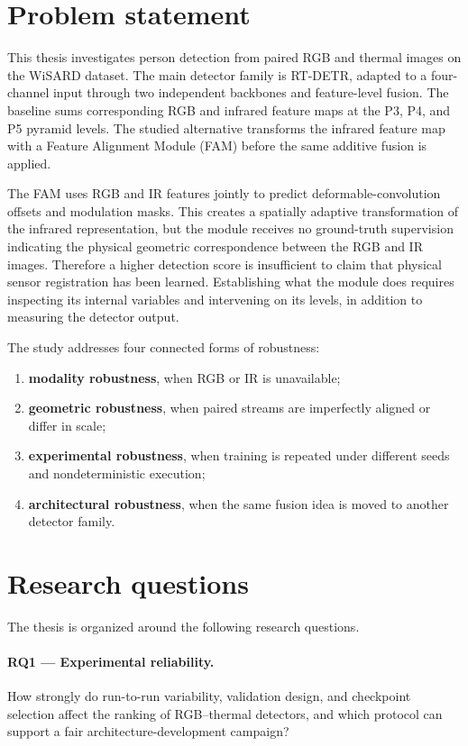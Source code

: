 \section{Problem statement}

This thesis investigates person detection from paired RGB and thermal images
on the WiSARD dataset. The main detector family is RT-DETR, adapted to a
four-channel input through two independent backbones and feature-level fusion.
The baseline sums corresponding RGB and infrared feature maps at the P3, P4,
and P5 pyramid levels. The studied alternative transforms the infrared feature
map with a Feature Alignment Module (FAM) before the same additive fusion is applied.

The FAM uses RGB and IR features jointly to predict deformable-convolution
offsets and modulation masks. This creates a spatially adaptive transformation
of the infrared representation, but the module receives no ground-truth supervision
indicating the physical geometric correspondence between the RGB and IR images.
Therefore a higher detection score is insufficient to claim that physical sensor
registration has been learned. Establishing what the module does requires inspecting
its internal variables and intervening on its levels, in addition to measuring the detector output.

The study addresses four connected forms of robustness:

\begin{enumerate}[label=\arabic*.]
  \item \textbf{modality robustness}, when RGB or IR is unavailable;
  \item \textbf{geometric robustness}, when paired streams are imperfectly
        aligned or differ in scale;
  \item \textbf{experimental robustness}, when training is repeated under
        different seeds and nondeterministic execution;
  \item \textbf{architectural robustness}, when the same fusion idea is moved
        to another detector family.
\end{enumerate}

\section{Research questions}

The thesis is organized around the following research questions.

\paragraph{RQ1 --- Experimental reliability.}
How strongly do run-to-run variability, validation design, and checkpoint
selection affect the ranking of RGB--thermal detectors, and which protocol can
support a fair architecture-development campaign?

